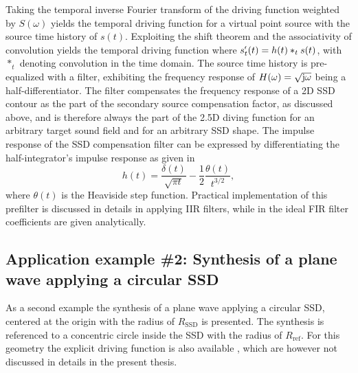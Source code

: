 Taking the temporal inverse Fourier transform of the driving function weighted by $S(\omega)$ yields the temporal driving function for a virtual point source with the source time history of $s(t)$.
Exploiting the shift theorem and the associativity of convolution yields the temporal driving function
where $s^{\nshortmid}_t( t ) = h(t) \ast_t s( t )$, with $\ast_t$ denoting convolution in the time domain.
The source time history is pre-equalized with a filter, exhibiting the frequency response of $H(\omega) = \sqrt{\mathrm{j} \omega}$ being a half-differentiator. 
The filter compensates the frequency response of a 2D SSD contour as the part of the secondary source compensation factor, as discussed above, and is therefore always the part of the 2.5D diving function for an arbitrary target sound field and for an arbitrary SSD shape.
The impulse response of the SSD compensation filter can be expressed by differentiating the half-integrator's impulse response as given in \cite{Deregowski1983}
\begin{equation}
h(t) = \frac{\delta(t)}{\sqrt{\pi t}} - \frac{1}{2} \frac{\theta(t)}{t^{3/2}},
\end{equation}
where $\theta(t)$ is the Heaviside step function.
Practical implementation of this prefilter is discussed in details in \cite{Schultz2013:IIR_prefilters} applying IIR filters, while in \cite[Sec. 2.5]{Schultz2016} the ideal FIR filter coefficients are given analytically.

\subsection*{Application example \#2: Synthesis of a plane wave applying a circular SSD}

As a second example the synthesis of a plane wave applying a circular SSD, centered at the origin with the radius of $R_{\mathrm{SSD}}$ is presented.
The synthesis is referenced to a concentric circle inside the SSD with the radius of $R_{\mathrm{ref}}$.
For this geometry the explicit driving function is also available \cite{Ahrens2008:Analytical_Circ_Spherical_SFS, Ahrens2009:circularSSD_mismatch, Ahrens2009:circular25D_SFR}, which are however not discussed in details in the present thesis.

